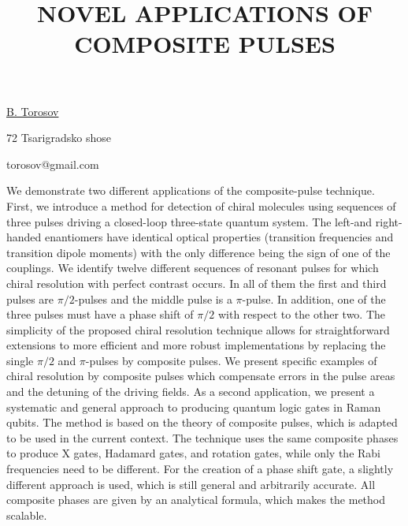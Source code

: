 \title{NOVEL APPLICATIONS OF COMPOSITE PULSES}

\underline{B. Torosov} 

{\normalsize{\vspace{-4mm}
72 Tsarigradsko shose



\email torosov@gmail.com}}

We demonstrate two different applications of the composite-pulse technique. First, we introduce a method for detection of chiral molecules using sequences of three pulses driving a closed-loop three-state quantum system. The left-and right-handed enantiomers have identical optical properties (transition frequencies and transition dipole moments) with the only difference being the sign of one of the couplings. We identify twelve different sequences of resonant pulses for which chiral resolution with perfect contrast occurs. In all of them the first and third pulses are $\pi/2$-pulses and the middle pulse is a $\pi$-pulse. In addition, one of the three pulses must have a phase shift of $\pi/2$ with respect to the other two. The simplicity of the proposed chiral resolution technique allows for straightforward extensions to more efficient and more robust implementations by replacing the single $\pi/2$ and $\pi$-pulses by composite pulses. We present specific examples of chiral resolution by composite pulses which compensate errors in the pulse areas and the detuning of the driving fields. As a second application, we present a systematic and general approach to producing quantum logic gates in Raman qubits. The method is based on the theory of composite pulses, which is adapted to be used in the current context. The technique uses the same composite phases to produce X gates, Hadamard gates, and rotation gates, while only the Rabi frequencies need to be different. For the creation of a phase shift gate, a slightly different approach is used, which is still general and arbitrarily accurate. All composite phases are given by an analytical formula, which makes the method scalable.

\vspace{\baselineskip}